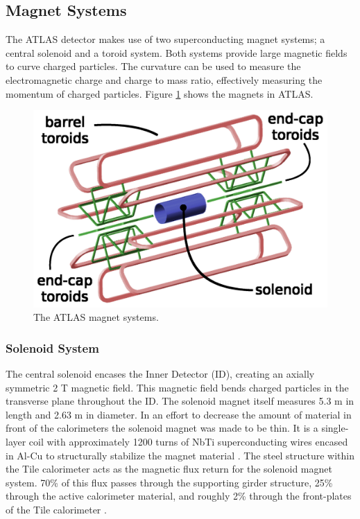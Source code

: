 	\subsection{Magnet Systems}\label{ssec:magnets}
	The ATLAS detector makes use of two superconducting magnet systems; a central solenoid and a toroid system. Both systems provide large magnetic fields to curve charged particles. The curvature can be used to measure the electromagnetic charge and charge to mass ratio, effectively measuring the momentum of charged particles. Figure \ref{fig:ATLAS-magnets} shows the magnets in ATLAS.

	\begin{figure}[!ht]
	\centering
	\includegraphics[width=.65\textwidth,keepaspectratio=true]{chapters/chapter3_experiment/images/magnetSystems.png}
	\caption{ The ATLAS magnet systems.}
	\label{fig:ATLAS-magnets}
	\end{figure}

	\subsubsection{Solenoid System}\label{sssec:solenoid}
	The central solenoid encases the Inner Detector (ID), creating an axially symmetric 2 T magnetic field. This magnetic field bends charged particles in the transverse plane throughout the ID. The solenoid magnet itself measures 5.3 m in length and 2.63 m in diameter. In an effort to decrease the amount of material in front of the calorimeters the solenoid magnet was made to be thin. It is a single-layer coil with approximately 1200 turns of NbTi superconducting wires encased in Al-Cu to structurally stabilize the magnet material \cite{atlas-solenoid}. The steel structure within the Tile calorimeter acts as the magnetic flux return for the solenoid magnet system. 70\% of this flux passes through the supporting girder structure, 25\% through the active calorimeter material, and roughly 2\% through the front-plates of the Tile calorimeter \cite{ATLAS-tile}.

